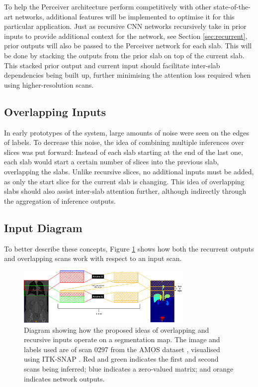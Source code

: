 \documentclass{l4proj}
\begin{document}
To help the Perceiver architecture perform competitively with other state-of-the-art networks, additional features will be implemented to optimise it for this particular application. Just as recursive CNN networks recursively take in prior inputs to provide additional context for the network, see Section \ref{sec:recurrent}, prior outputs will also be passed to the Perceiver network for each slab. This will be done by stacking the outputs from the prior slab on top of the current slab. This stacked prior output and current input should facilitate inter-slab dependencies being built up, further minimising the attention loss required when using higher-resolution scans.

\subsection{Overlapping Inputs}

In early prototypes of the system, large amounts of noise were seen on the edges of labels. To decrease this noise, the idea of combining multiple inferences over slices was put forward: Instead of each slab starting at the end of the last one, each slab would start a certain number of slices into the previous slab, overlapping the slabs. Unlike recursive slices, no additional inputs must be added, as only the start slice for the current slab is changing. This idea of overlapping slabs should also assist inter-slab attention further, although indirectly through the aggregation of inference outputs.

\subsection{Input Diagram}

To better describe these concepts, Figure \ref{fig:inputs_diagram} shows how both the recurrent outputs and overlapping scans work with respect to an input scan.

\begin{figure}[htb] 
    \centering

     \includegraphics[width=0.75\textwidth]{images/inputs_diagram.png}
     \caption{Diagram showing how the proposed ideas of overlapping and recursive inputs operate on a segmentation map. The image and labels used are of scan 0297 from the AMOS dataset \citep{ji2022amos}, visualised using ITK-SNAP \citep{itksnap}. Red and green indicates the first and second scans being inferred; blue indicates a zero-valued matrix; and orange indicates network outputs.}
     \label{fig:inputs_diagram}
\end{figure}
\end{document}
